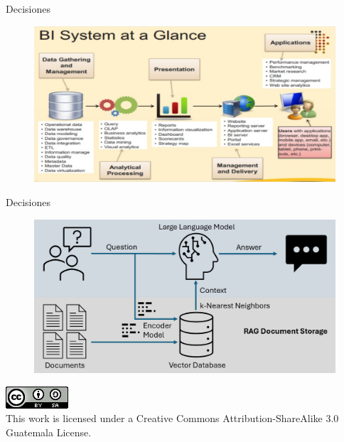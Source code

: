 \documentclass[aspectratio=169]{beamer}
\begin{document}
\begin{frame}{Decisiones}
	\begin{figure}
		\centering
		\includegraphics[width=0.8\linewidth]{Images/decisionestecnologia.png}	
	\end{figure}
\end{frame}
\begin{frame}{Decisiones}
	\begin{figure}
		\centering
		\includegraphics[width=0.8\linewidth]{Images/rag}	
	\end{figure}
\end{frame}
\begin{frame}
\begin{center}
\includegraphics[width=0.1\linewidth]{Images/cclogo}
\\
This work is licensed under a Creative Commons Attribution-ShareAlike 
3.0 Guatemala License.
\end{center}
\end{frame}
\end{document}
